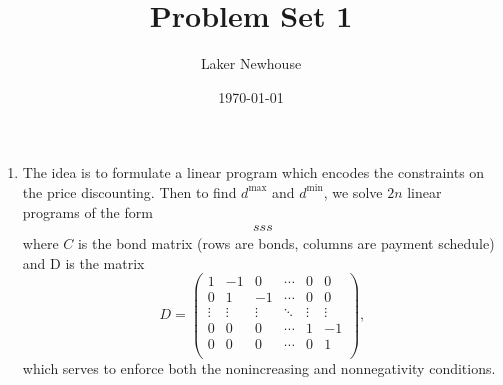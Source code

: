 \documentclass[11pt]{article}
\title{Problem Set 1}
\author{Laker Newhouse}
\date{\today}
\begin{document}
\maketitle	

\begin{enumerate}
    \item The idea is to formulate a linear program which encodes the constraints on the price discounting. Then to find $d^\text{max}$ and $d^\text{min}$, we solve $2n$ linear programs of the form \begin{align*}
            sss
    \end{align*} where $C$ is the bond matrix (rows are bonds, columns are payment schedule) and D is the matrix \[
        D = \begin{pmatrix}
            1 & -1 & 0 & \cdots & 0 & 0 \\
            0 & 1 & -1 & \cdots & 0 & 0 \\
            \vdots & \vdots & \vdots & \ddots & \vdots & \vdots \\
            0 & 0 & 0 & \cdots & 1 & -1 \\
            0 & 0 & 0 & \cdots & 0 & 1 \\
        \end{pmatrix},
    \] which serves to enforce both the nonincreasing and nonnegativity conditions.
\end{enumerate}
\end{document}
